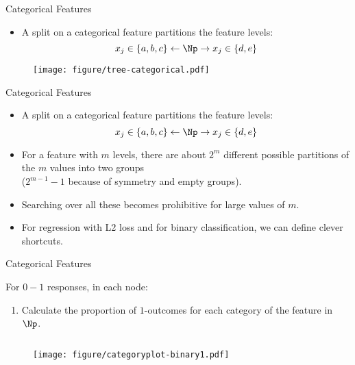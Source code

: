 \documentclass[11pt,compress,t,notes=noshow, xcolor=table]{beamer}
\begin{document}
\begin{frame2}{Categorical Features}
  \begin{itemize}
  \item A split on a categorical feature partitions the feature levels:
    $$x_j \in \{a,b,c\} \leftarrow \Np \rightarrow x_j \in \{d,e\} $$
  \end{itemize}
  \begin{figure}
   \texttt{[image: figure/tree-categorical.pdf]} 
  \end{figure}
  \end{frame2}
  
  \begin{frame2}{Categorical Features}
  \begin{itemize}
  \item A split on a categorical feature partitions the feature levels:
    $$x_j \in \{a,b,c\} \leftarrow \Np \rightarrow x_j \in \{d,e\} $$
  \item For a feature with $m$ levels,
  there are about $2^m$ different possible partitions of the $m$ values into two groups\\ ($2^{m-1} - 1$ because of symmetry and empty groups).
  \item Searching over all these becomes prohibitive for large values of $m$.
  \item For regression with L2 loss and for binary classification, we can define clever shortcuts.
  \end{itemize}

  \end{frame2}
  
  \begin{frame}{Categorical Features}

For $0-1$ responses, in each node:
  \begin{enumerate}
  \item Calculate the proportion of $1$-outcomes for each category of the feature in $\Np$.

  \end{enumerate}
  \begin{columns}
  \begin{column}{0.33\textwidth}
  \begin{figure}
  \texttt{[image: figure/categoryplot-binary1.pdf]} 
  \end{figure}
  \end{column}
  \begin{column}{0.33\textwidth}
  \lz
  \end{column}
  \begin{column}{0.33\textwidth}
  \lz
  \end{column}
  \end{columns}

\end{frame}
\end{document}
